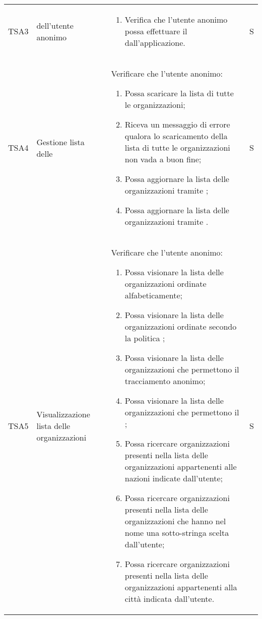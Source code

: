 {\begin{longtable}{ c  C{2.5cm}  C{10cm} C{1cm}}
TSA3  &  dell'utente anonimo & \begin{enumerate}
    \item Verifica che l'utente anonimo possa effettuare il  dall'applicazione.
\end{enumerate} & S \\

TSA4 & Gestione lista delle  &
Verificare che l'utente anonimo:
\begin{enumerate}
    \item Possa scaricare la lista di tutte le organizzazioni;
    \item Riceva un messaggio di errore qualora lo scaricamento della lista di tutte le organizzazioni non vada a buon fine;
    \item Possa aggiornare la lista delle organizzazioni tramite ;
    \item Possa aggiornare la lista delle organizzazioni tramite .
\end{enumerate} & S \\

TSA5 & Visualizzazione lista delle organizzazioni & 
Verificare che l'utente anonimo:
\begin{enumerate}
    \item Possa visionare la lista delle organizzazioni ordinate alfabeticamente;
    \item Possa visionare la lista delle organizzazioni ordinate secondo la politica ;
    \item Possa visionare la lista delle organizzazioni che permettono il tracciamento anonimo;
    \item Possa visionare la lista delle organizzazioni che permettono il ;
    \item Possa ricercare organizzazioni presenti nella lista delle organizzazioni appartenenti alle nazioni indicate dall'utente;
    \item Possa ricercare organizzazioni presenti nella lista delle organizzazioni che hanno nel nome una sotto-stringa scelta dall'utente;
    \item Possa ricercare organizzazioni presenti nella lista delle organizzazioni appartenenti alla città indicata dall'utente.
\end{enumerate} & S \\


\end{longtable}}
